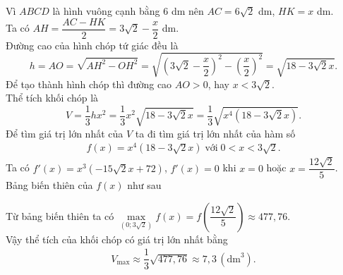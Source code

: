 \begin{ex}
{\begin{center}
        \end{center}
        Vì $ABCD$ là hình vuông cạnh bằng $6$ dm nên $AC=6\sqrt{2}$ dm, $HK=x$ dm.\\
        Ta có $AH=\dfrac{AC-HK}{2}=3\sqrt{2}-\dfrac{x}{2}$ dm.\\
        Đường cao của hình chóp tứ giác đều là
        \[h=AO=\sqrt{AH^2-OH^2}=\sqrt{\left(3\sqrt{2}-\dfrac{x}{2}\right)^2-\left(\dfrac{x}{2}\right)^2}=\sqrt{18-3\sqrt{2}x}.\]
        Để tạo thành hình chóp thì đường cao $AO>0$, hay $x<3\sqrt{2}$.\\
        Thể tích khối chóp là
        \[V=\dfrac{1}{3}hx^2=\dfrac{1}{3}x^2\sqrt{18-3\sqrt{2}x}=\dfrac{1}{3}\sqrt{x^4\left(18-3\sqrt{2}x\right)}.\]
        Để tìm giá trị lớn nhất của $V$ ta đi tìm giá trị lớn nhất của hàm số
        \allowdisplaybreaks
        \begin{eqnarray*}
            f(x)=x^4\left(18-3\sqrt{2}x\right)\;\text{với}\;0<x<3\sqrt{2}.
        \end{eqnarray*}
        Ta có $f'(x)=x^3\left(-15 \sqrt{2} x+72\right)$, $f'(x)=0$ khi $x=0$ hoặc $x=\dfrac{12 \sqrt{2}}{5}$.\\
        Bảng biến thiên của $f(x)$ như sau
        \begin{center}
        \end{center}
        Từ bảng biến thiên ta có $\max\limits_{(0; 3 \sqrt{2})}f(x)=f\left(\dfrac{12 \sqrt{2}}{5}\right)\approx 477{,}76$.\\
        Vậy thể tích của khối chóp có giá trị lớn nhất bằng
        \allowdisplaybreaks
        \begin{eqnarray*}
            V_{\max}\approx\dfrac{1}{3}\sqrt{477{,}76}\approx7{,}3\,\left(\text{dm}^3\right).
        \end{eqnarray*}
    }
\end{ex}

